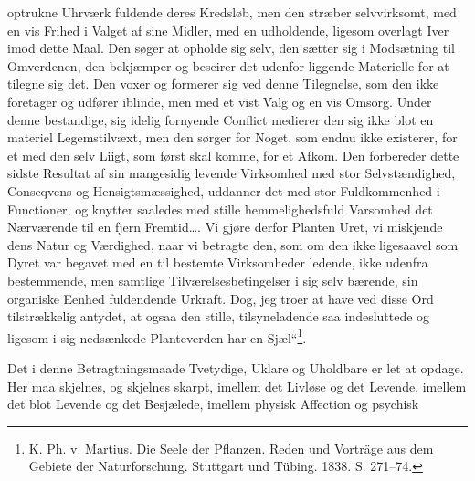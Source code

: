 \documentclass[12pt,a4paper]{book}
\begin{document}
\setcounter{footnote}{0}
optrukne Uhrværk fuldende deres Kredsløb, men den stræber selvvirksomt, med en
vis Frihed i Valget af sine Midler, med en udholdende, ligesom overlagt Iver
imod dette Maal. Den søger at opholde sig selv, den sætter sig i Modsætning til
Omverdenen, den bekjæmper og beseirer det udenfor liggende Materielle for at
tilegne sig det. Den voxer og formerer sig ved denne Tilegnelse, som den ikke
foretager og udfører iblinde, men med et vist Valg og en vis Omsorg. Under
denne bestandige, sig idelig fornyende Conflict medierer den sig ikke blot en
materiel Legemstilvæxt, men den sørger for Noget, som endnu ikke existerer, for
et med den selv Liigt, som først skal komme, for et Afkom. Den forbereder dette
sidste Resultat af sin mangesidig levende Virksomhed med stor Selvstændighed,
Conseqvens og Hensigtsmæssighed, uddanner det med stor Fuldkommenhed i
Functioner, og knytter saaledes med stille hemmelighedsfuld Varsomhed det
Nærværende til en fjern Fremtid\ldots. Vi gjøre derfor Planten Uret, vi
miskjende dens Natur og Værdighed, naar vi betragte den, som om den ikke
ligesaavel som Dyret var begavet med en til bestemte Virksomheder ledende, ikke
udenfra bestemmende, men samtlige Tilværelsesbetingelser i sig selv bærende,
sin organiske Eenhed fuldendende Urkraft. Dog, jeg troer at have ved disse Ord
tilstrækkelig antydet, at ogsaa den stille, tilsyneladende saa indesluttede og
ligesom i sig nedsænkede Planteverden har en Sjæl“\footnote{K. Ph. v. Martius.
Die Seele der Pflanzen. Reden und Vorträge aus dem Gebiete der Naturforschung.
Stuttgart und Tübing. 1838. S. 271--74.}.

Det i denne Betragtningsmaade Tvetydige, Uklare og Uholdbare er let at opdage.
Her maa skjelnes, og skjelnes skarpt, imellem det Livløse og det Levende,
imellem det blot Levende og det Besjælede, imellem physisk Affection og psychisk
\end{document}

